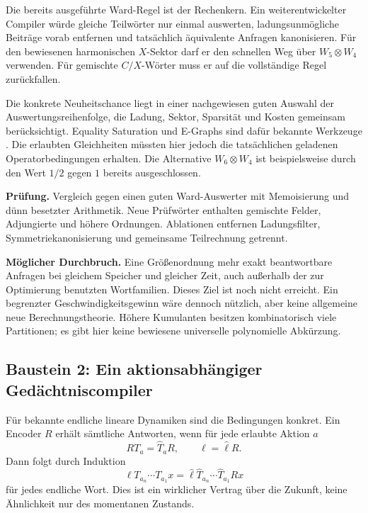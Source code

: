 Die bereits ausgeführte Ward-Regel ist der Rechenkern. Ein weiterentwickelter Compiler würde gleiche Teilwörter nur einmal auswerten, ladungsunmögliche Beiträge vorab entfernen und tatsächlich äquivalente Anfragen kanonisieren. Für den bewiesenen harmonischen $X$-Sektor darf er den schnellen Weg über $W_5\otimes W_4$ verwenden. Für gemischte $C/X$-Wörter muss er auf die vollständige Regel zurückfallen.

Die konkrete Neuheitschance liegt in einer nachgewiesen guten Auswahl der Auswertungsreihenfolge, die Ladung, Sektor, Sparsität und Kosten gemeinsam berücksichtigt. Equality Saturation und E-Graphs sind dafür bekannte Werkzeuge \cite{egg}. Die erlaubten Gleichheiten müssten hier jedoch die tatsächlichen geladenen Operatorbedingungen erhalten. Die Alternative $W_6\otimes W_4$ ist beispielsweise durch den Wert $1/2$ gegen $1$ bereits ausgeschlossen.

\textbf{Prüfung.} Vergleich gegen einen guten Ward-Auswerter mit Memoisierung und dünn besetzter Arithmetik. Neue Prüfwörter enthalten gemischte Felder, Adjungierte und höhere Ordnungen. Ablationen entfernen Ladungsfilter, Symmetriekanonisierung und gemeinsame Teilrechnung getrennt.

\textbf{Möglicher Durchbruch.} Eine Größenordnung mehr exakt beantwortbare Anfragen bei gleichem Speicher und gleicher Zeit, auch außerhalb der zur Optimierung benutzten Wortfamilien. Dieses Ziel ist noch nicht erreicht. Ein begrenzter Geschwindigkeitsgewinn wäre dennoch nützlich, aber keine allgemeine neue Berechnungstheorie. Höhere Kumulanten besitzen kombinatorisch viele Partitionen; es gibt hier keine bewiesene universelle polynomielle Abkürzung.

\subsection{Baustein 2: Ein aktionsabhängiger Gedächtniscompiler}
Für bekannte endliche lineare Dynamiken sind die Bedingungen konkret. Ein Encoder $R$ erhält sämtliche Antworten, wenn für jede erlaubte Aktion $a$
\begin{equation}\label{eq:compiler}
RT_a=\widehat T_aR,\qquad\ell=\widehat\ell R.
\end{equation}
Dann folgt durch Induktion
\begin{equation}
\ell T_{a_n}\cdots T_{a_1}x
=\widehat\ell\widehat T_{a_n}\cdots\widehat T_{a_1}Rx
\end{equation}
für jedes endliche Wort. Dies ist ein wirklicher Vertrag über die Zukunft, keine Ähnlichkeit nur des momentanen Zustands.

